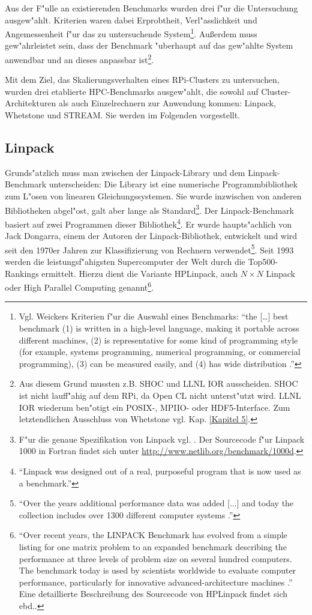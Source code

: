 Aus der F"ulle an existierenden Benchmarks wurden drei f"ur die Untersuchung ausgew"ahlt. Kriterien waren dabei Erprobtheit, Verl"asslichkeit und Angemessenheit f"ur das zu untersuchende System\footnote{Vgl. Weickers Kriterien f"ur die Auswahl eines Benchmarks: "`the [\dots] best benchmark (1) is written in a high-level language, making it portable across different machines, (2) is representative for some kind of programming style (for example, systems programming, numerical programming, or commercial programming), (3) can be measured easily, and (4) has wide distribution \cite{wei90}."'}. Au\ss erdem muss gew"ahrleistet sein, dass der Benchmark "uberhaupt auf das gew"ahlte System anwendbar und an dieses anpassbar ist\footnote{Aus diesem Grund mussten z.B. SHOC und LLNL IOR ausscheiden. SHOC ist nicht lauff"ahig auf dem RPi, da Open CL nicht unterst"utzt wird. LLNL IOR wiederum ben"otigt ein POSIX-, MPIIO- oder HDF5-Interface. Zum letztendlichen Ausschluss von Whetstone vgl. Kap. \ref{Kapitel 5}.}. 

Mit dem Ziel, das Skalierungsverhalten eines RPi-Clusters zu untersuchen, wurden drei etablierte HPC-Benchmarks ausgew"ahlt, die sowohl auf Cluster-Architekturen als auch Einzelrechnern zur Anwendung kommen: Linpack, Whetstone und STREAM. Sie werden im Folgenden vorgestellt. 

\subsection{Linpack}\label{Linpack}

Grunds"atzlich muss man zwischen der Linpack-Library und dem Linpack-Benchmark unterscheiden: Die Library ist eine numerische Programmbibliothek zum L"osen von linearen Gleichungssystemen. Sie wurde inzwischen von anderen Bibliotheken abgel"ost, galt aber lange als Standard\footnote{F"ur die genaue Spezifikation von Linpack vgl. \cite{don03}. Der Sourcecode f"ur Linpack 1000 in Fortran findet sich unter \url{http://www.netlib.org/benchmark/1000d}.}. Der Linpack-Benchmark basiert auf zwei Programmen dieser Bibliothek\footnote{"`Linpack was designed out of a real, purposeful program that is now used as a benchmark\cite{wei90}."'}. Er wurde haupts"achlich von Jack Dongarra, einem der Autoren der Linpack-Bibliothek, entwickelt und wird seit den 1970er Jahren zur Klassifizierung von Rechnern verwendet\footnote{"`Over the years additional performance data was added [...] and today the collection includes over 1300 different computer systems \cite{don03}."'}. Seit 1993 werden die leistungsf"ahigsten Supercomputer der Welt durch die Top500-Rankings ermittelt. Hierzu dient die Variante HPLinpack, auch $N\times N$ Linpack oder High Parallel Computing genannt\footnote{"`Over recent years, the LINPACK Benchmark has evolved from a simple listing for one matrix problem to an expanded benchmark describing the performance at three levels of problem size on several hundred computers. The benchmark today is used by scientists worldwide to evaluate computer performance, particularly for innovative advanced-architecture machines \cite{don03}."' Eine detaillierte Beschreibung des Sourcecode von HPLinpack findet sich ebd..}. 

